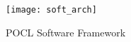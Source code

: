 \begin{figure}[h]
    \centering
    \texttt{[image: soft\_arch]}
    \caption{POCL Software Framework}
    \label{fig:4_PM}
\end{figure}
